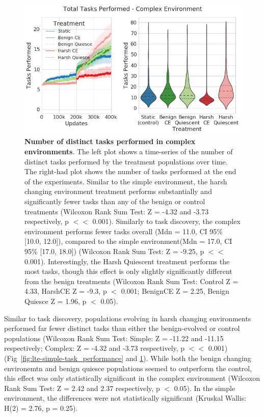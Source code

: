\documentclass[PhD]{msu-thesis}
\begin{document}
	\begin{figure}[!h]
	\includegraphics[width=0.95\columnwidth]{figures/LTE/lte-complex-task_performance.png}
	\caption{\textbf{Number of distinct tasks performed in complex environments}. The left plot shows a time-series of the number of distinct tasks performed by the treatment populations over time. The right-had plot shows the number of tasks performed at the end of the experiments. Similar to the simple environment, the harsh changing environment treatment performs substantially and significantly fewer tasks than any of the benign or control treatments (Wilcoxon Rank Sum Test: Z = -4.32 and -3.73 respectively, p $<<$ 0.001). Similarly to task discovery, the complex environment performs fewer tasks overall (Mdn = 11.0, CI 95\% [10.0, 12.0]), compared to the simple environment(Mdn = 17.0, CI 95\% [17.0, 18.0]) (Wilcoxon Rank Sum Test: Z = -9.25, p $<<$ 0.001). Interestingly, the Harsh Quiescent treatment performs the most tasks, though this effect is only slightly significantly different from the benign treatments (Wilcoxon Rank Sum Test: Control Z = 4.33, HarshCE Z = -9.3, p $<$ 0.001; BenignCE Z = 2.25, Benign Quiesce Z = 1.96, p $<$ 0.05).  %
	}
	\label{fig:complex-task_performance}
	\end{figure}

Similar to task discovery, populations evolving in harsh changing environments performed far fewer distinct tasks than either the benign-evolved or control populations (Wilcoxon Rank Sum Test: Simple: Z = -11.22 and -11.15 respectively; Complex: Z = -4.32 and -3.73 respectively, p $<<$ 0.001) (Fig~\ref{fig:lte-simple-task_performance} and \ref{fig:complex-task_performance}). While both the benign changing environemtn and benign quiesce
populations seemed to outperform the control, this effect was only statistically significant in the complex environment (Wilcoxon Rank Sum Test: Z = 2.42 and 2.37 respectively, p $<$ 0.05). In the simple environment, the differences were not statistically significant (Kruskal Wallis: H(2) = 2.76, p = 0.25).
\end{document}
